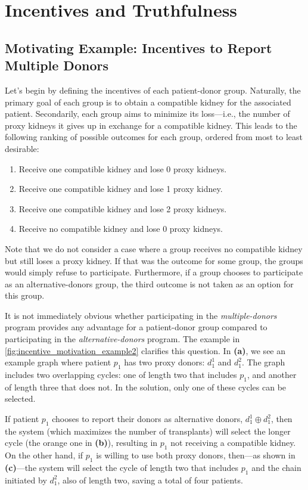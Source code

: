 \chapter{Incentives and Truthfulness}
\label{cha:incentives_and_truthfulness}


\section{Motivating Example: Incentives to Report Multiple Donors}
\label{sec:incentives}

Let's begin by defining the incentives of each patient-donor group. Naturally, the primary goal of each group is to obtain a compatible kidney for the associated patient. Secondarily, each group aims to minimize its loss—i.e., the number of proxy kidneys it gives up in exchange for a compatible kidney. This leads to the following ranking of possible outcomes for each group, ordered from most to least desirable:

\begin{enumerate}
\item Receive one compatible kidney and lose 0 proxy kidneys.
\item Receive one compatible kidney and lose 1 proxy kidney.
\item Receive one compatible kidney and lose 2 proxy kidneys.
\item Receive no compatible kidney and lose 0 proxy kidneys.
\end{enumerate}

Note that we do not consider a case where a group receives no compatible kidney but still loses a proxy kidney. If that was the outcome for some group, the groups would simply refuse to participate. Furthermore, if a group chooses to participate as an alternative-donors group, the third outcome is not taken as an option for this group.

It is not immediately obvious whether participating in the \textit{multiple-donors} program provides any advantage for a patient-donor group compared to participating in the \textit{alternative-donors} program. The example in \autoref{fig:incentive_motivation_example2} clarifies this question. In \textbf{(a)}, we see an example graph where patient $p_1$ has two proxy donors: $d_1^1$ and $d_1^2$. The graph includes two overlapping cycles: one of length two that includes $p_1$, and another of length three that does not. In the solution, only one of these cycles can be selected.

If patient $p_1$ chooses to report their donors as alternative donors, $d_1^1 \oplus d_1^2$, then the system (which maximizes the number of transplants) will select the longer cycle (the orange one in \textbf{(b)}), resulting in $p_1$ not receiving a compatible kidney. On the other hand, if $p_1$ is willing to use both proxy donors, then—as shown in \textbf{(c)}—the system will select the cycle of length two that includes $p_1$ and the chain initiated by $d_1^2$, also of length two, saving a total of four patients.

